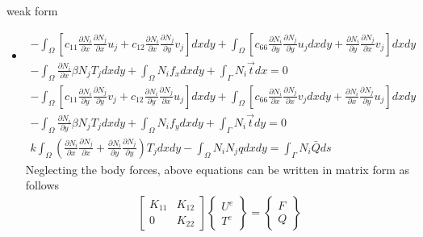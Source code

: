 \documentclass{beamer}
\begin{document}
\begin{frame}[t,fragile]{weak form}
    \begin{itemize}
            \tiny
        \item \begin{align}
     -\int_{\Omega}^{}\left[ c_{11}\frac{\partial N_i}{\partial x}\frac{\partial N_j}{\partial x}u_j+c_{12}\frac{\partial N_i}{\partial x}\frac{\partial N_j}{\partial y}v_j\right]dxdy+\int_{\Omega}^{}\left[c_{66}\frac{\partial N_i}{\partial y}\frac{\partial N_j}{\partial y}u_jdxdy+\frac{\partial N_i}{\partial y}\frac{\partial N_j}{\partial x}v_j\right]dxdy\nonumber\\ -\int_{\Omega}^{}\frac{\partial N_i}{\partial x}\beta N_jT_j dxdy +\int_{\Omega}^{}N_if_x
     dxdy+\int_{\Gamma}^{}N_i\vec{t}dx=0\label{24}\end{align}
 \begin{align}
     -\int_{\Omega}^{}\left[ c_{11}\frac{\partial N_i}{\partial y}\frac{\partial N_j}{\partial y}v_j+c_{12}\frac{\partial N_i}{\partial y}\frac{\partial N_j}{\partial x}u_j\right]dxdy+\int_{\Omega}^{}\left[c_{66}\frac{\partial N_i}{\partial x}\frac{\partial N_j}{\partial x}v_jdxdy+\frac{\partial N_i}{\partial x}\frac{\partial N_j}{\partial y}u_j\right]dxdy\nonumber\\ -\int_{\Omega}^{}\frac{\partial N_i}{\partial y}\beta N_jT_j dxdy+\int_{\Omega}^{}N_if_y dxdy+\int_{\Gamma}^{}N_i\vec{t}dy=0\label{25}\\
        k\int_{\Omega}\left( \frac{\partial N_i}{\partial x}\frac{\partial N_j}{\partial x}+\frac{\partial N_i}{\partial y}\frac{\partial N_j}{\partial y} \right)T_jdxdy-\int_{\Omega}^{}N_iN_jqdxdy=\int_{\Gamma}^{}N_i\bar{Q}ds& \label{26} \end{align}
Neglecting the body forces, above equations can be written in matrix form as follows\\ 
    \begin{align}
\begin{bmatrix}
    K_{11} & K_{12} \\
    0 & K_{22}
\end{bmatrix}
\begin{Bmatrix}
    U^e\\ T^e
\end{Bmatrix}=
\begin{Bmatrix}
    F\\ Q
\end{Bmatrix}
\end{align} 
    \end{itemize}
\end{frame}
\end{document}
